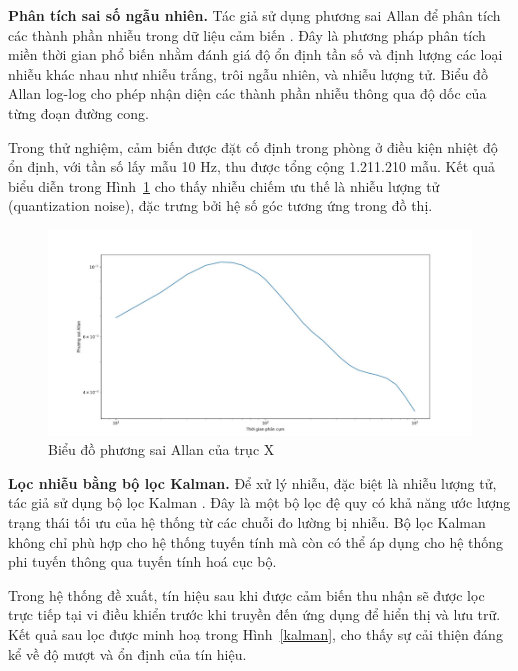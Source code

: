 \textbf{Phân tích sai số ngẫu nhiên.} Tác giả sử dụng phương sai Allan 
để phân tích các thành phần nhiễu trong dữ liệu cảm biến \cite{allan}. 
Đây là phương pháp phân tích miền thời gian phổ biến nhằm đánh giá độ 
ổn định tần số và định lượng các loại nhiễu khác nhau như nhiễu trắng, 
trôi ngẫu nhiên, và nhiễu lượng tử. Biểu đồ Allan log-log cho phép nhận 
diện các thành phần nhiễu thông qua độ dốc của từng đoạn đường cong.

Trong thử nghiệm, cảm biến được đặt cố định trong phòng ở điều kiện 
nhiệt độ ổn định, với tần số lấy mẫu 10 Hz, thu được tổng cộng 1.211.210 
mẫu. Kết quả biểu diễn trong Hình~\ref{allan_real} cho thấy nhiễu chiếm 
ưu thế là nhiễu lượng tử (quantization noise), đặc trưng bởi hệ số góc 
tương ứng trong đồ thị.



\begin{figure}[htbp]
    \centering
    \includegraphics[width=\textwidth]{images/allan_real.png}
    \caption{Biểu đồ phương sai Allan của trục X}
    \label{allan_real}
\end{figure}

\textbf{Lọc nhiễu bằng bộ lọc Kalman.} Để xử lý nhiễu, đặc biệt là nhiễu 
lượng tử, tác giả sử dụng bộ lọc Kalman \cite{kalman}. Đây là một bộ lọc 
đệ quy có khả năng ước lượng trạng thái tối ưu của hệ thống từ các chuỗi 
đo lường bị nhiễu. Bộ lọc Kalman không chỉ phù hợp cho hệ thống tuyến 
tính mà còn có thể áp dụng cho hệ thống phi tuyến thông qua tuyến tính 
hoá cục bộ.

Trong hệ thống đề xuất, tín hiệu sau khi được cảm biến thu nhận sẽ 
được lọc trực tiếp tại vi điều khiển trước khi truyền đến ứng dụng 
để hiển thị và lưu trữ. Kết quả sau lọc được minh hoạ trong 
Hình~\ref{kalman}, cho thấy sự cải thiện đáng kể về độ mượt và ổn 
định của tín hiệu.


